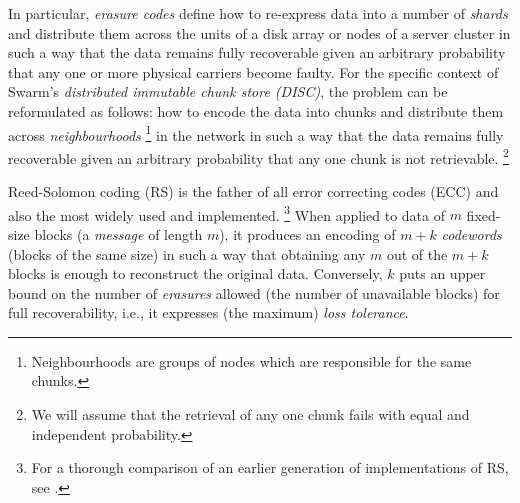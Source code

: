 \documentclass[manuscript,screen,review]{acmart}
\begin{document}
In particular, \emph{erasure codes} define how to re-express data into a number of \textit{shards} and distribute them across the units of a disk array or nodes of a server cluster in such a way that the data remains fully recoverable given an arbitrary probability that any one or more physical carriers become faulty.
For the specific context of Swarm's \emph{distributed immutable chunk store (DISC)}, the problem can be reformulated as follows: how to encode the data into chunks and distribute them across \textit{neighbourhoods}%
%
\footnote{Neighbourhoods are groups of nodes which are responsible for the same chunks.}
%
in the network in such a way that the data remains fully recoverable given an arbitrary probability that any one chunk is not retrievable.%
%
\footnote{We will assume that the retrieval of any one chunk fails with equal and independent probability.}

Reed-Solomon coding (RS)  \citep{reed1960polynomial,lubyetal1995CRS,plank2006optimizing,li2013erasure}
is the father of all  error correcting codes (ECC) and also the most widely used and implemented.%
%
\footnote{%
For a thorough comparison of an earlier generation of implementations of RS, see \citet{plank2009performance}.}
%
When applied to data of $m$ fixed-size blocks (a \emph{message} of length $m$), it produces an encoding of $m+k$ \emph{codewords} (blocks of the same size) in such a way that obtaining any $m$ out of the $m+k$ blocks is enough to reconstruct the original data. Conversely, $k$ puts an upper bound on the number of \emph{erasures} allowed (the number of unavailable blocks) for full recoverability, i.e., it expresses (the maximum) \emph{loss tolerance}.
\end{document}
